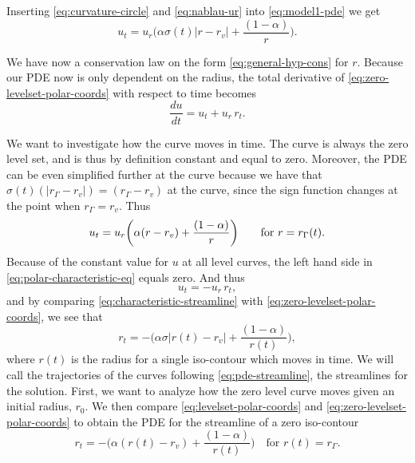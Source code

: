 Inserting \eqref{eq:curvature-circle} and \eqref{eq:nablau-ur} into \eqref{eq:model1-pde} we get
\begin{equation}
    u_t = u_r \bigg(\alpha \sigma(t)|r-r_v| + \frac{(1-\alpha)}{r} \bigg).
    \label{eq:zero-levelset-polar-coords}
\end{equation}

We have now a conservation law on the form \eqref{eq:general-hyp-cons} for $r$. Because our PDE now is only dependent on the radius, the total derivative of \eqref{eq:zero-levelset-polar-coords} with respect to time becomes
\begin{equation}
    \frac{du}{dt} = u_t + u_r \,r_t.
    \label{eq:polar-characteristic-eq}
\end{equation}

We want to investigate how the curve moves in time. The curve is always the zero level set, and is thus by definition constant and equal to zero. Moreover, the PDE can be even simplified further at the curve because we have that $\sigma(t)(|r_{\Gamma}-r_v|) = (r_{\Gamma}-r_v)$ at the curve, since the sign function changes at the point when $r_{\Gamma}=r_v$. Thus 
\begin{equation}
    u_t = u_r \bigg(\alpha (r-r_v) + \frac{(1-\alpha)}{r} \bigg) \qquad \text{for } r=r_{\Gamma}(t).
    \label{eq:levelset-polar-coords}
\end{equation}
Because of the constant value for $u$ at all level curves, the left hand side in \eqref{eq:polar-characteristic-eq} equals zero. And thus
\begin{equation}
    u_t=-u_r\, r_t,
    \label{eq:characteristic-streamline}
\end{equation}
and by comparing \eqref{eq:characteristic-streamline} with \eqref{eq:zero-levelset-polar-coords}, we see that
\begin{equation}
    r_t = -\bigg(\alpha \sigma|r(t)-r_v| + \frac{(1-\alpha)}{r(t)}\bigg),
    \label{eq:pde-streamline}
\end{equation}
where $r(t)$ is the radius for a single iso-contour which moves in time. We will call the trajectories of the curves following \eqref{eq:pde-streamline}, the streamlines for the solution. First, we want to analyze how the zero level curve moves given an initial radius, $r_0$. We then compare  \eqref{eq:levelset-polar-coords} and \eqref{eq:zero-levelset-polar-coords} to obtain the PDE for the streamline of a zero iso-contour
\begin{equation}
    r_t = -\bigg(\alpha (r(t)-r_v) + \frac{(1-\alpha)}{r(t)}\bigg) \quad \text{for }r(t) = r_{\Gamma}.
    \label{eq:pde-zero-streamline}
\end{equation}


